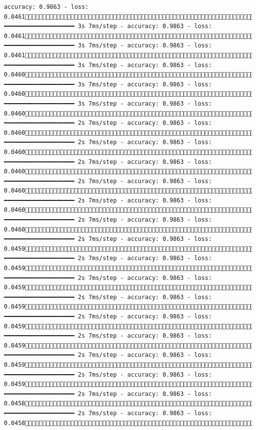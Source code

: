 \documentclass[
  letterpaper,
  DIV=11,
  numbers=noendperiod]{scrreprt}
\begin{document}
\begin{verbatim}
accuracy: 0.9863 - loss: 0.04611434/1875 ━━━━━━━━━━━━━━━━━━━━ 3s 7ms/step - accuracy: 0.9863 - loss: 0.04611442/1875 ━━━━━━━━━━━━━━━━━━━━ 3s 7ms/step - accuracy: 0.9863 - loss: 0.04611449/1875 ━━━━━━━━━━━━━━━━━━━━ 3s 7ms/step - accuracy: 0.9863 - loss: 0.04601456/1875 ━━━━━━━━━━━━━━━━━━━━ 3s 7ms/step - accuracy: 0.9863 - loss: 0.04601463/1875 ━━━━━━━━━━━━━━━━━━━━ 3s 7ms/step - accuracy: 0.9863 - loss: 0.04601471/1875 ━━━━━━━━━━━━━━━━━━━━ 2s 7ms/step - accuracy: 0.9863 - loss: 0.04601478/1875 ━━━━━━━━━━━━━━━━━━━━ 2s 7ms/step - accuracy: 0.9863 - loss: 0.04601485/1875 ━━━━━━━━━━━━━━━━━━━━ 2s 7ms/step - accuracy: 0.9863 - loss: 0.04601492/1875 ━━━━━━━━━━━━━━━━━━━━ 2s 7ms/step - accuracy: 0.9863 - loss: 0.04601499/1875 ━━━━━━━━━━━━━━━━━━━━ 2s 7ms/step - accuracy: 0.9863 - loss: 0.04601507/1875 ━━━━━━━━━━━━━━━━━━━━ 2s 7ms/step - accuracy: 0.9863 - loss: 0.04601515/1875 ━━━━━━━━━━━━━━━━━━━━ 2s 7ms/step - accuracy: 0.9863 - loss: 0.04591523/1875 ━━━━━━━━━━━━━━━━━━━━ 2s 7ms/step - accuracy: 0.9863 - loss: 0.04591531/1875 ━━━━━━━━━━━━━━━━━━━━ 2s 7ms/step - accuracy: 0.9863 - loss: 0.04591539/1875 ━━━━━━━━━━━━━━━━━━━━ 2s 7ms/step - accuracy: 0.9863 - loss: 0.04591546/1875 ━━━━━━━━━━━━━━━━━━━━ 2s 7ms/step - accuracy: 0.9863 - loss: 0.04591553/1875 ━━━━━━━━━━━━━━━━━━━━ 2s 7ms/step - accuracy: 0.9863 - loss: 0.04591561/1875 ━━━━━━━━━━━━━━━━━━━━ 2s 7ms/step - accuracy: 0.9863 - loss: 0.04591568/1875 ━━━━━━━━━━━━━━━━━━━━ 2s 7ms/step - accuracy: 0.9863 - loss: 0.04591576/1875 ━━━━━━━━━━━━━━━━━━━━ 2s 7ms/step - accuracy: 0.9863 - loss: 0.04581584/1875 ━━━━━━━━━━━━━━━━━━━━ 2s 7ms/step - accuracy: 0.9863 - loss: 0.04581592/1875 
\end{verbatim}
\end{document}
